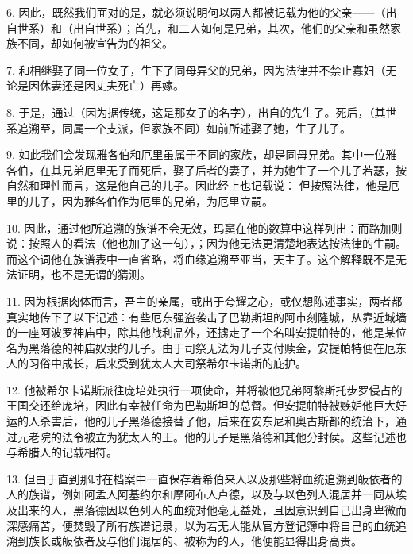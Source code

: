 6. 因此，既然我们面对的是，就必须说明何以两人都被记载为他的父亲——（出自世系）和（出自世系）；首先，和二人如何是兄弟，其次，他们的父亲和虽然家族不同，却如何被宣告为的祖父。\par

7. 和相继娶了同一位女子，生下了同母异父的兄弟，因为法律并不禁止寡妇（无论是因休妻还是因丈夫死亡）再嫁。\par

8. 于是，通过（因为据传统，这是那女子的名字），出自的先生了。死后，（其世系追溯至，同属一个支派，但家族不同）如前所述娶了她，生了儿子。\par

9. 如此我们会发现雅各伯和厄里虽属于不同的家族，却是同母兄弟。其中一位雅各伯，在其兄弟厄里无子而死后，娶了后者的妻子，并为她生了一个儿子若瑟，按自然和理性而言，这是他自己的儿子。因此经上也记载说： 但按照法律，他是厄里的儿子，因为雅各伯作为厄里的兄弟，为厄里立嗣。\par

10. 因此，通过他所追溯的族谱不会无效，玛窦在他的数算中这样列出：而路加则说：按照人的看法（他也加了这一句），；因为他无法更清楚地表达按法律的生嗣。而这个词他在族谱表中一直省略，将血缘追溯至亚当，天主子。这个解释既不是无法证明，也不是无谓的猜测。\par

11. 因为根据肉体而言，吾主的亲属，或出于夸耀之心，或仅想陈述事实，两者都真实地传下了以下记述：有些厄东强盗袭击了巴勒斯坦的阿市刻隆城，从靠近城墙的一座阿波罗神庙中，除其他战利品外，还掳走了一个名叫安提帕特的，他是某位名为黑落德的神庙奴隶的儿子。由于司祭无法为儿子支付赎金，安提帕特便在厄东人的习俗中成长，后来受到犹太人大司祭希尔卡诺斯的庇护。\par

12. 他被希尔卡诺斯派往庞培处执行一项使命，并将被他兄弟阿黎斯托步罗侵占的王国交还给庞培，因此有幸被任命为巴勒斯坦的总督。但安提帕特被嫉妒他巨大好运的人杀害后，他的儿子黑落德接替了他，后来在安东尼和奥古斯都的统治下，通过元老院的法令被立为犹太人的王。他的儿子是黑落德和其他分封侯。这些记述也与希腊人的记载相符。\par

13. 但由于直到那时在档案中一直保存着希伯来人以及那些将血统追溯到皈依者的人的族谱，例如阿孟人阿基约尔和摩阿布人卢德，以及与以色列人混居并一同从埃及出来的人，黑落德因以色列人的血统对他毫无益处，且因意识到自己出身卑微而深感痛苦，便焚毁了所有族谱记录，以为若无人能从官方登记簿中将自己的血统追溯到族长或皈依者及与他们混居的、被称为的人，他便能显得出身高贵。\par

